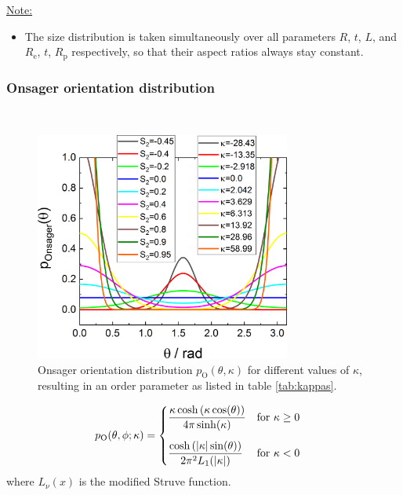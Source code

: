 \vspace{5mm}

\underline{Note:}
\begin{itemize}
\item The size distribution is taken simultaneously over all parameters $R$, $t$, $L$, and $R_\mathrm{e}$, $t$, $R_\mathrm{p}$ respectively, so that their aspect ratios always stay constant.
\end{itemize}

\newpage
\subsubsection{Onsager orientation distribution} ~\\

\begin{figure}[htb]
\includegraphics[width=0.75\textwidth]{../images/form_factor/cylindrical_obj/pOnsagerGr.png}
\caption{Onsager orientation distribution $p_\mathrm{O}(\theta,\kappa)$ for different values of $\kappa$, resulting in an order parameter as listed in table \ref{tab:kappas}.}
\label{fig:pOnsagerGr}
\end{figure}

\begin{align}
p_\mathrm{O}(\theta,\phi;\kappa) & =
\begin{cases} \displaystyle
\frac{\kappa \cosh\left(\kappa \cos(\theta)\right)}{4\pi \sinh(\kappa)}      &\mathrm{for~} \kappa \geq 0 \\[5mm]
 \displaystyle
\frac{\cosh\left(\abs{\kappa} \sin(\theta)\right)}{2\pi^2 L_1(\abs{\kappa})}  &\mathrm{for~} \kappa < 0
\end{cases}
\end{align}
where $L_\nu(x)$ is the modified Struve function.

